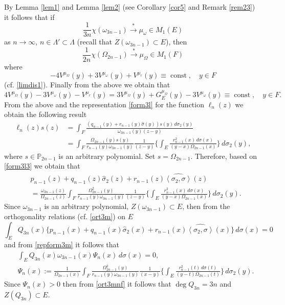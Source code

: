 \documentclass[11pt, a4paper, twoside]{article}
\def\<{\left\langle}
\def\>{\right\rangle}
\let\myh\widehat
\def\PP{\mathbb P}
\def\mdeg{\operatorname{deg}}
\def\const{\operatorname{const}}
\theoremstyle{plain}
\theoremstyle{definition}
\begin{document}
By Lemma \ref{lem1} and Lemma \ref{lem2} (see Corollary \ref{cor5} and Remark \ref{rem23}) it follows that if
$$
\frac1{3n}\chi(\omega_{3n-1}) \overset{*}\longrightarrow \mu_\omega\in M_1(E)
$$
as $n\to\infty$, $n\in\Lambda'\subset \Lambda$ (recall that $Z(\omega_{3n-1})\subset E$), then
$$
\frac1{2n}\chi(\Omega_{2n-1}){\overset{*}\longrightarrow}\mu_\Omega\in M_1(F)
$$
where
$$
-4V^{\mu_\Omega}(y)+3V^{\mu_\omega}(y)+V^{\mu_r}(y)\equiv\const,\quad y\in F
$$
(cf. \eqref{limdis1}). Finally from the above we obtain that
$$
4V^{\mu_\Omega}(y)-3V^{\mu_\omega}(y)-V^{\mu_r}(y)
=3V^{\mu_\Omega}(y)+G_E^{\mu_\Omega}(y)-3V^{\mu_\omega}(y)\equiv\const,\quad y\in F.
$$
From the above and the representation \eqref{form3l} for the function $\ell_n(z)$ we obtain the following result 
\begin{align}
\ell_n(z)s(z)&=\int_F
\frac{(q_{n-1}(y)+r_{n-1}(y)\myh{\sigma}(y))s(y)
\,d\sigma_2(y)}{\omega_{3n-1}(y)(z-y)}\nonumber\\
&=\int_F\frac{\Omega_{2n-1}(y)s(y)}{r_{n-1}(y)\omega_{3n-1}(y)}\frac1{(z-y)}
\biggl\{
\int_E\frac{r^2_{n-1}(x)\,d\sigma(x)}{(y-x)\Omega_{2n-1}(x)}\biggr\}\,d\sigma_2(y),
\label{form3l3}
\end{align}
where $s\in\PP_{2n-1}$ is an arbitrary polynomial.
Set $s=\Omega_{2n-1}$. Therefore, based on \eqref{form3l3} we obtain that
\begin{align}
&p_{n-1}(z)+q_{n-1}(z)\myh{\sigma}_2(z)+r_{n-1}(z)\myh{\<\sigma_2,\sigma\>}(z)\nonumber\\
&=\frac{\omega_{3n-1}(z)}{\Omega_{2n-1}(z)}\int_F \frac{\Omega^2_{2n-1}(y)}{r_{n-1}(y)\omega_{3n-1}(y)}\frac1{(z-y)}\biggl\{\int_E\frac{r^2_{n-1}(x)\,d\sigma(x)}{(y-x)\Omega_{2n-1}(x)}\biggr\}\,d\sigma_2(y).\label{repform3m}
\end{align}
Since $\omega_{3n-1}$ is an arbitrary polynomial, $Z(\omega_{3n-1})\subset E$, then from the orthogonality relations (cf. \eqref{ort3m}) on $E$
\begin{equation}
\int_E Q_{3n}(x)\{
p_{n-1}(x)+q_{n-1}(x)\myh{\sigma}_2(x)
+r_{n-1}(x)\myh{\<\sigma_2,\sigma\>}(x)
\}\,d\sigma(x)=0
\label{ort3mn}
\end{equation}
and from \eqref{repform3m} it follows that
\begin{align}
&\int_E Q_{3n}(x)\omega_{3n-1}(x)\Psi_n(x)\,d\sigma(x)=0,\label{ort3mnf}\\
&\Psi_n(x):=\frac1{\Omega_{2n-1}(x)}\int_F \frac{\Omega^2_{2n-1}(y)}{r_{n-1}(y)\omega_{3n-1}(y)}\frac1{(x-y)}\biggl\{\int_E\frac{r^2_{n-1}(t)\,d\sigma(t)}{(y-t)\Omega_{2n-1}(t)}\biggr\}\,d\sigma_2(y).\nonumber
\end{align}
Since $\Psi_n(x)>0$ then from \eqref{ort3mnf} it follows that $\mdeg{Q_{3n}}=3n$ and $Z(Q_{3n})\subset E$.
\end{document}
